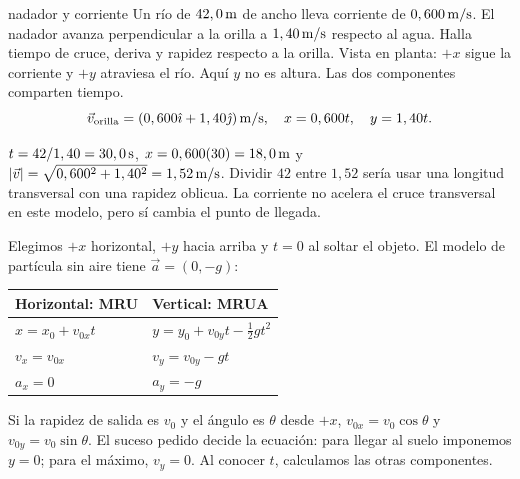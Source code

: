 \documentclass[11pt,a4paper]{article}
\begin{document}
\begin{examplebox}{nadador y corriente}
 Un r\'io de $42,0\,\mathrm{m}$ de ancho lleva corriente de
$0,600\,\mathrm{m/s}$. El nadador avanza perpendicular a la orilla a $1,40\,\mathrm{m/s}$ respecto
al agua. Halla tiempo de cruce, deriva y rapidez respecto a la orilla.
\solutionblock
{} Vista en planta: $+x$ sigue la corriente y $+y$ atraviesa el r\'io.
Aqu\'i $y$ no es altura. Las dos componentes comparten tiempo.
\[
\vec v_{\mathrm{orilla}}=(0,600\hat{\imath}+1,40\hat{\jmath})\,\mathrm{m/s},\quad
x=0,600t,\quad y=1,40t.
\]
\begin{center}
\end{center}
 $t=42/1,40=30,0\,\mathrm{s}$,
$x=0,600(30)=18,0\,\mathrm{m}$ y
$|\vec v|=\sqrt{0,600^2+1,40^2}=1,52\,\mathrm{m/s}$.
 Dividir $42$ entre $1,52$ ser\'ia usar una longitud
transversal con una rapidez oblicua. La corriente no acelera el cruce transversal
en este modelo, pero s\'i cambia el punto de llegada.
\end{examplebox}

Elegimos $+x$ horizontal, $+y$ hacia arriba y $t=0$ al soltar el objeto.
El modelo de part\'icula sin aire tiene $\vec a=(0,-g)$:
\par\medskip
\begin{tabularx}{\linewidth}{@{}Y Y@{}}
\toprule
Horizontal: MRU & Vertical: MRUA\\
\midrule
$x=x_0+v_{0x}t$ & $y=y_0+v_{0y}t-\tfrac12gt^2$\\
$v_x=v_{0x}$ & $v_y=v_{0y}-gt$\\
$a_x=0$ & $a_y=-g$\\
\bottomrule
\end{tabularx}
\par\medskip
Si la rapidez de salida es $v_0$ y el \'angulo es $\theta$ desde $+x$,
$v_{0x}=v_0\cos\theta$ y $v_{0y}=v_0\sin\theta$.
El suceso pedido decide la ecuaci\'on: para llegar al suelo imponemos $y=0$;
para el m\'aximo, $v_y=0$. Al conocer $t$, calculamos las otras componentes.
\end{document}
